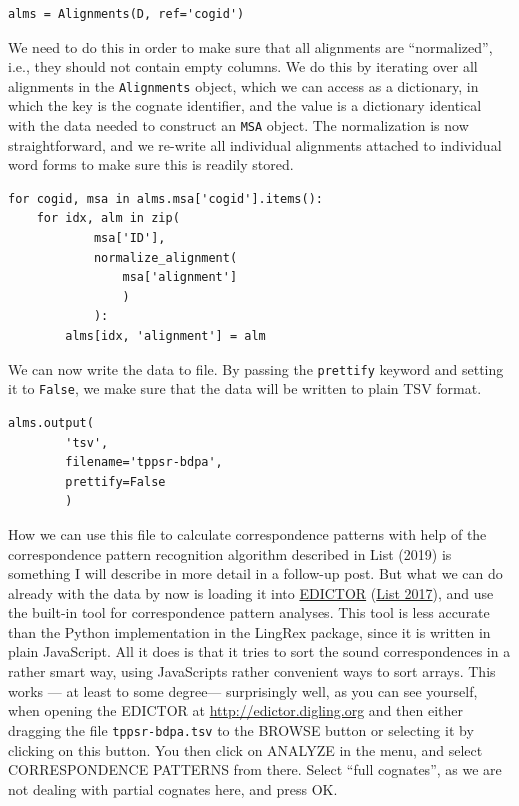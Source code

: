 \documentclass[
  a4paper,
  14pt,
  oneside,
  tablecaptionabove
]{scrbook}
\newcommand{\passthrough}[1]{#1}
\begin{document}
\begin{lstlisting}
alms = Alignments(D, ref='cogid')
\end{lstlisting}

We need to do this in order to make sure that all alignments are
\enquote{normalized}, i.e., they should not contain empty columns. We do
this by iterating over all alignments in the
\passthrough{\lstinline!Alignments!} object, which we can access as a
dictionary, in which the key is the cognate identifier, and the value is
a dictionary identical with the data needed to construct an
\passthrough{\lstinline!MSA!} object. The normalization is now
straightforward, and we re-write all individual alignments attached to
individual word forms to make sure this is readily stored.

\begin{lstlisting}
for cogid, msa in alms.msa['cogid'].items():
    for idx, alm in zip(
            msa['ID'],
            normalize_alignment(
                msa['alignment']
                )
            ):
        alms[idx, 'alignment'] = alm
\end{lstlisting}

We can now write the data to file. By passing the
\passthrough{\lstinline!prettify!} keyword and setting it to
\passthrough{\lstinline!False!}, we make sure that the data will be
written to plain TSV format.

\begin{lstlisting}
alms.output(
        'tsv',
        filename='tppsr-bdpa',
        prettify=False
        )
\end{lstlisting}

How we can use this file to calculate correspondence patterns with help
of the correspondence pattern recognition algorithm described in List
(2019) is something I will describe in more detail in a follow-up post.
But what we can do already with the data by now is loading it into
\href{http://edictor.digling.org}{EDICTOR} 
(\href{http://bibliography.lingpy.org?key=List2017d}{List 2017}), and
use the built-in tool for correspondence pattern analyses. This tool is
less accurate than the Python implementation in the LingRex package,
since it is written in plain JavaScript. All it does is that it tries to
sort the sound correspondences in a rather smart way, using JavaScripts
rather convenient ways to sort arrays. This works --- at least to some
degree--- surprisingly well, as you can see yourself, when opening the
EDICTOR at \url{http://edictor.digling.org} and then either dragging the
file \passthrough{\lstinline!tppsr-bdpa.tsv!} to the BROWSE button or
selecting it by clicking on this button. You then click on ANALYZE in
the menu, and select CORRESPONDENCE PATTERNS from there. Select
\enquote{full cognates}, as we are not dealing with partial cognates
here, and press OK.
\end{document}
